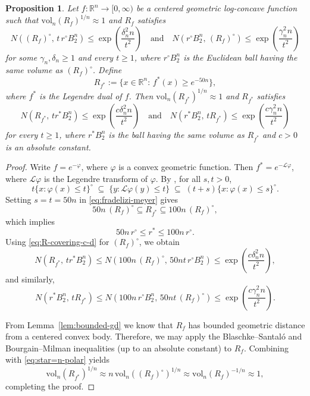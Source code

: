 \documentclass[11pt,leqno]{article}
\newtheorem{proposition}[theorem]{Proposition}
\theoremstyle{definition}
\theoremstyle{remark}
\numberwithin{equation}{section}
\newcommand{\vol}{\mathrm{vol}}
\newcommand{\ls}{\leqslant}
\newcommand{\gr}{\geqslant}
\begin{document}
\begin{proposition}\label{prop:fcover-3}
Let $f:\mathbb{R}^n\to[0,\infty)$ be a centered geometric log-concave function such that  
$\vol_n(R_f)^{1/n}\approx 1$ and $R_f$ satisfies 
\begin{equation}N((R_f)^{\circ},\, t\,r^{\circ}B_2^n)\ls \exp\!\left(\frac{\delta_n^2 n}{t^2}\right) 
\quad \text{and}\quad  
N(r^{\circ}B_2^n,\, (R_f)^{\circ})\ls \exp\!\left(\frac{\gamma_n^2 n}{t^2}\right)\label{eq:R-covering-c-d}\end{equation}
for some $\gamma_n,\delta_n\gr 1$ and every $t\gr 1$, where $r^{\circ}B_2^n$ is the Euclidean ball having the same 
volume as $(R_f)^{\circ}$.  Define
$$R_{f^{\ast}}:= \{x\in\mathbb{R}^n:\, f^{\ast}(x)\gr e^{-50n}\},$$
where $f^{\ast}$ is the Legendre dual of $f$. Then $\vol_n(R_{f^{\ast}})^{1/n}\approx 1$ and 
$R_{f^{\ast}}$ satisfies
\begin{equation}\label{eq:R-covering-e-f}
N(R_{f^{\ast}},\, t r^{\ast} B_2^n)\ls \exp\!\left(\frac{c\delta_n^2 n}{t^2}\right)
\quad \text{and}\quad 
N(r^{\ast}B_2^n,\, t R_{f^{\ast}})\ls  \exp\!\left(\frac{c\gamma_n^2 n}{t^2}\right)
\end{equation}
for every $t\gr 1$, where $r^{\ast}B_2^n$ is the ball having the same volume as $R_{f^{\ast}}$
and $c>0$ is an absolute constant.
\end{proposition}

\begin{proof}
Write $f=e^{-\varphi}$, where $\varphi$ is a convex geometric function.  
Then $f^{\ast}=e^{-\mathcal{L}\varphi}$, where $\mathcal{L}\varphi$ is the Legendre transform of $\varphi$.
By \cite[Lemma~8]{Fradelizi-Meyer-2008}, for all $s,t>0$,
\begin{equation}\label{eq:fradelizi-meyer}
t\{x:\varphi(x)\ls t\}^{\circ}\;\subseteq\;\{y:\mathcal{L}\varphi(y)\ls t\}
\;\subseteq\;(t+s)\{x:\varphi(x)\ls s\}^{\circ}.
\end{equation}
Setting $s=t=50n$ in \eqref{eq:fradelizi-meyer} gives
\begin{equation}\label{eq:star=n-polar}50n\,(R_f)^{\circ}\subseteq R_{f^{\ast}}\subseteq 100n\, (R_f)^{\circ},\end{equation}
which implies
$$50n\,r^{\circ} \ls r^{\ast} \ls 100n\,r^{\circ}.$$
Using \eqref{eq:R-covering-c-d} for $(R_f)^{\circ}$, we obtain
$$N(R_{f^{\ast}},\, t r^{\ast} B_2^n)\ls N(100n\,(R_f)^{\circ},\, 50nt\,r^{\circ}B_2^n)
\ls \exp\!\left(\frac{c\delta_n^2 n}{t^2}\right),$$
and similarly,
$$N(r^{\ast}B_2^n,\, t R_{f^{\ast}})\ls N(100n\,r^{\circ}B_2^n,\, 50nt\, (R_f)^{\circ})
\ls \exp\!\left(\frac{c\gamma_n^2 n}{t^2}\right).$$

From Lemma~\ref{lem:bounded-gd} we know that $R_f$ has bounded geometric distance from a centered
convex body. Therefore, we may apply the Blaschke--Santal\'{o} and Bourgain--Milman inequalities 
(up to an absolute constant) to $R_f$. Combining with \eqref{eq:star=n-polar} yields
$$\vol_n(R_{f^{\ast}})^{1/n}\approx n\,\vol_n((R_f)^{\circ})^{1/n}\approx \vol_n(R_f)^{-1/n}\approx 1,$$
completing the proof.
\end{proof}
\end{document}
